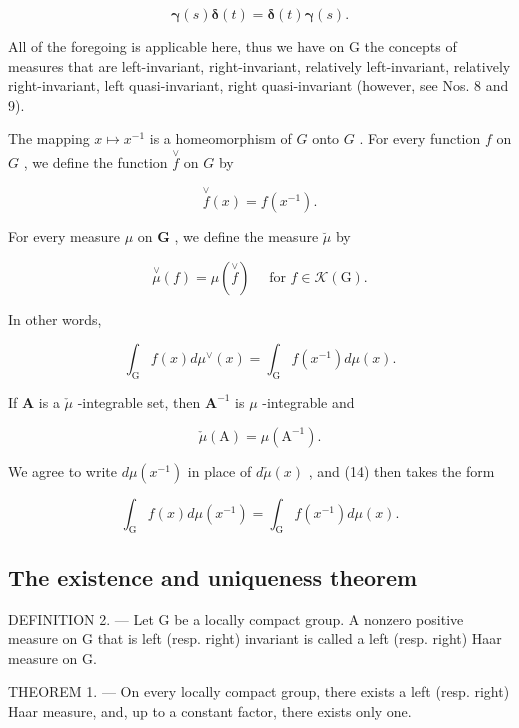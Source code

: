\[
\boldsymbol {\gamma} (s) \boldsymbol {\delta} (t) = \boldsymbol {\delta} (t) \boldsymbol {\gamma} (s).\tag{11}
\]

All of the foregoing is applicable here, thus we have on G the concepts of measures that are left-invariant, right-invariant, relatively left-invariant, relatively right-invariant, left quasi-invariant, right quasi-invariant (however, see Nos. 8 and 9).

The mapping \(x \mapsto x^{-1}\) is a homeomorphism of \(G\) onto \(G\) . For every function \(f\) on \(G\) , we define the function \(\overset{\vee}{f}\) on \(G\) by

\[
\stackrel {\vee} {f} (x) = f (x ^ {- 1}).\tag{12}
\]

For every measure \(\mu\) on \(\mathbf{G}\) , we define the measure \(\breve{\mu}\) by

\[
\stackrel {\vee} {\mu} (f) = \mu (\stackrel {\vee} {f}) \quad \text { for } f \in \mathcal {K} (\mathrm{G}).\tag{13}
\]

In other words,

\[
\int_ {\mathrm{G}} f (x) d \mu^ {\vee} (x) = \int_ {\mathrm{G}} f (x ^ {- 1}) d \mu (x).\tag{14}
\]

If \(\mathbf{A}\) is a \(\check{\mu}\) -integrable set, then \(\mathbf{A}^{-1}\) is \(\mu\) -integrable and

\[
\check {\mu} (\mathrm{A}) = \mu (\mathrm{A} ^ {- 1}).\tag{15}
\]

We agree to write \(d\mu(x^{-1})\) in place of \(d\check{\mu}(x)\) , and (14) then takes the form

\[
\int_ {\mathrm{G}} f (x) d \mu (x ^ {- 1}) = \int_ {\mathrm{G}} f (x ^ {- 1}) d \mu (x).
\]

\subsection{The existence and uniqueness theorem}

DEFINITION 2. --- Let G be a locally compact group. A nonzero positive measure on G that is left (resp. right) invariant is called a left (resp. right) Haar measure on G.

THEOREM 1. --- On every locally compact group, there exists a left (resp. right) Haar measure, and, up to a constant factor, there exists only one.

